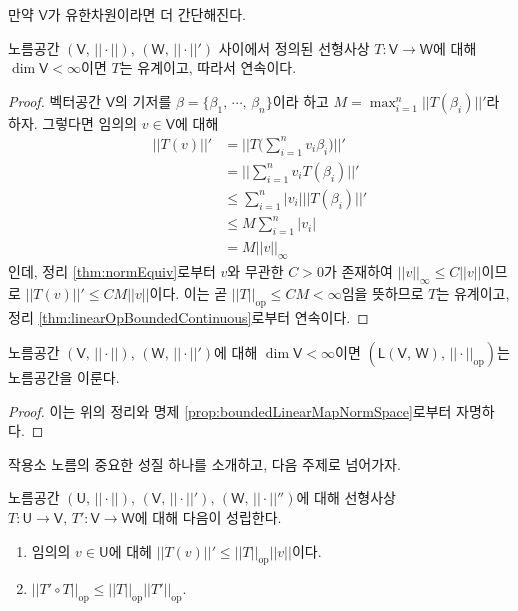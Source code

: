 만약 $\mathsf{V}$가 유한차원이라면 더 간단해진다.

\begin{theorem}
    노름공간 $(\mathsf{V},\,||\cdot||),\,(\mathsf{W},\,||\cdot||')$ 사이에서 정의된 선형사상 $T:\mathsf{V}\to\mathsf{W}$에 대해 $\dim\mathsf{V}<\infty$이면 $T$는 유계이고, 따라서 연속이다.
\end{theorem}

\begin{proof}
    벡터공간 $\mathsf{V}$의 기저를 $\beta=\{\beta_1,\,\cdots,\,\beta_n\}$이라 하고 $M=\max_{i=1}^n||T(\beta_i)||'$라 하자. 그렇다면 임의의 $v\in\mathsf{V}$에 대해
    \begin{align*}
        ||T(v)||'&=\bigg|\bigg|T\bigg(\sum_{i=1}^nv_i\beta_i\bigg)\bigg|\bigg|'\\
        &=\bigg|\bigg|\sum_{i=1}^nv_iT(\beta_i)\bigg|\bigg|'\\
        &\leq\sum_{i=1}^n|v_i|||T(\beta_i)||'\\
        &\leq M\sum_{i=1}^n|v_i|\\
        &=M||v||_\infty
    \end{align*}
    인데, 정리 \ref{thm:normEquiv}로부터 $v$와 무관한 $C>0$가 존재하여 $||v||_\infty\leq C||v||$이므로 $||T(v)||'\leq CM||v||$이다. 이는 곧 $||T||_\mathrm{op}\leq CM<\infty$임을 뜻하므로 $T$는 유계이고, 정리 \ref{thm:linearOpBoundedContinuous}로부터 연속이다.
\end{proof}

\begin{corollary}\label{cor:finiteDimensionNormSpace}
    노름공간 $(\mathsf{V},\,||\cdot||),\,(\mathsf{W},\,||\cdot||')$에 대해 $\dim\mathsf{V}<\infty$이면 $(\mathsf{L}(\mathsf{V},\,\mathsf{W}),\,||\cdot||_\mathrm{op})$는 노름공간을 이룬다.
\end{corollary}

\begin{proof}
    이는 위의 정리와 명제 \ref{prop:boundedLinearMapNormSpace}로부터 자명하다.
\end{proof}

작용소 노름의 중요한 성질 하나를 소개하고, 다음 주제로 넘어가자.

\begin{theorem}\label{thm:opNormProp}
    노름공간 $(\mathsf{U},\,||\cdot||),\,(\mathsf{V},\,||\cdot||'),\,(\mathsf{W},\,||\cdot||'')$에 대해 선형사상 $T:\mathsf{U}\to\mathsf{V},\,T':\mathsf{V}\to\mathsf{W}$에 대해 다음이 성립한다.
    \begin{enumerate}
        \item 임의의 $v\in\mathsf{U}$에 대헤 $||T(v)||'\leq||T||_\mathrm{op}||v||$이다.
        \item $||T'\circ T||_\mathrm{op}\leq||T||_\mathrm{op}||T'||_\mathrm{op}$.
    \end{enumerate}
\end{theorem}


